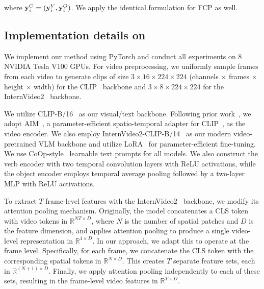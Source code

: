 where $\mathbf{y}^C_i=(\mathbf{y}^V_i,\mathbf{y}^O_i)$.
We apply the identical formulation for FCP as well.





\subsection{Implementation details on \ours{}}
\label{sec:imple_detail_ours}




We implement our method using PyTorch and conduct all experiments on 8 NVIDIA Tesla V100 GPUs.
For video preprocessing, we uniformly sample frames from each video to generate clips of size $3 \times 16 \times 224 \times 224$ (channels $\times$ frames $\times$ height $\times$ width) for the CLIP~\cite{radford2021clip} backbone and $3 \times 8 \times 224 \times 224$ for the InternVideo2~\cite{wang2024iv2} backbone.

We utilize CLIP-B/16~\cite{radford2021clip} as our visual/text backbone. 
Following prior work~\cite{li2024c2c}, we adopt AIM~\cite{yang2023aim}, a parameter-efficient spatio-temporal adapter for CLIP~\cite{radford2021clip}, as the video encoder.
We also employ InternVideo2-CLIP-B/14~\cite{wang2024iv2} as our modern video-pretrained VLM backbone and utilize LoRA~\cite{hu2022lora} for parameter-efficient fine-tuning.
We use CoOp-style~\cite{zhou2022coop} learnable text prompts for all models.
We also construct the verb encoder with two temporal convolution layers with ReLU activations, while the object encoder employs temporal average pooling followed by a two-layer MLP with ReLU activations.

To extract $T$ frame-level features with the InternVideo2~\cite{wang2024iv2} backbone, we modify its attention pooling mechanism.
Originally, the model concatenates a CLS token with video tokens in $\mathbb{R}^{NT \times D}$, where $N$ is the number of spatial patches and $D$ is the feature dimension, and applies attention pooling to produce a single video-level representation in $\mathbb{R}^{1 \times D}$.
In our approach, we adapt this to operate at the frame level. Specifically, for each frame, we concatenate the CLS token with the corresponding spatial tokens in $\mathbb{R}^{N \times D}$.
This creates $T$ separate feature sets, each in $\mathbb{R}^{(N + 1) \times D}$.
Finally, we apply attention pooling independently to each of these sets, resulting in the frame-level video features in $\mathbb{R}^{T \times D}$.




